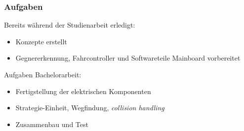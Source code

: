 \begin{frame}
	\frametitle{Aufgaben}
	Bereits während der Studienarbeit erledigt:
	\begin{itemize}
		\item Konzepte erstellt
		\item Gegnererkennung, Fahrcontroller und Softwareteile Mainboard vorbereitet
	\end{itemize}
	\vspace{1em}
	Aufgaben Bachelorarbeit:
	\begin{itemize}
	   	\item Fertigstellung der elektrischen Komponenten
	   	\item Strategie-Einheit, Wegfindung, \textit{collision handling}
	   	\item Zusammenbau und Test
	\end{itemize}

\end{frame}
